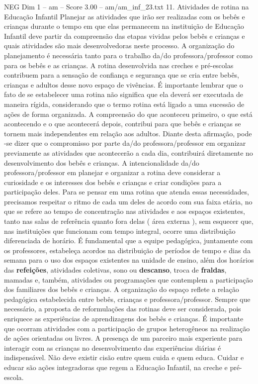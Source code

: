 \begin{textsample}{NEG Dim 1 – am – Score 3.00 – am/am\_inf\_23.txt}  \label{ex:f1_neg_067}
11.
Atividades de rotina na Educação Infantil Planejar as atividades que irão ser realizadas com os bebês e crianças durante o tempo em que elas permanecem na instituição de Educação Infantil deve partir da compreensão das etapas vividas pelos bebês e crianças e quais atividades são mais desenvolvedoras neste processo.
A organização do planejamento é necessária tanto para o trabalho da/do professora/professor como para os bebês e as crianças.
A rotina desenvolvida nas creches e pré-escolas contribuem para a sensação de confiança e segurança que se cria entre bebês, crianças e adultos desse novo espaço de vivências.
É importante lembrar que o fato de se estabelecer uma rotina não significa que ela deverá ser executada de maneira rígida, considerando que o termo rotina está ligado a uma sucessão de ações de forma organizada.
A compreensão do que aconteceu primeiro, o que está acontecendo e o que acontecerá depois, contribui para que bebês e crianças se tornem mais independentes em relação aos adultos.
Diante desta afirmação, pode -se dizer que o compromisso por parte da/do professora/professor em organizar previamente as atividades que acontecerão a cada dia, contribuirá diretamente no desenvolvimento dos bebês e crianças.
A intencionalidade da/do professora/professor em planejar e organizar a rotina deve considerar a curiosidade e os interesses dos bebês e crianças e criar condições para a participação deles.
Para se pensar em uma rotina que atenda essas necessidades, precisamos respeitar o ritmo de cada um deles de acordo com sua faixa etária, no que se refere ao tempo de concentração nas atividades e aos espaços existentes, tanto nas salas de referência quanto fora delas ( área externa ), sem esquecer que, nas instituições que funcionam com tempo integral, ocorre uma distribuição diferenciada de horário.
É fundamental que a equipe pedagógica, juntamente com os professores, estabeleça acordos na distribuição de períodos de tempo e dias da semana para o uso dos espaços existentes na unidade de ensino, além dos horários das \textbf{refeições}, atividades coletivas, sono ou \textbf{descanso}, troca de \textbf{fraldas}, mamadas e, também, atividades ou programações que contemplem a participação dos familiares dos bebês e crianças.
A organização do espaço reflete a relação pedagógica estabelecida entre bebês, crianças e professora/professor.
Sempre que necessário, a proposta de reformulações das rotinas deve ser considerada, pois enriquece as experiências de aprendizagens dos bebês e crianças.
É importante que ocorram atividades com a participação de grupos heterogêneos na realização de ações orientadas ou livres.
A presença de um parceiro mais experiente para interagir com as crianças no desenvolvimento das experiências diárias é indispensável.
Não deve existir cisão entre quem cuida e quem educa.
Cuidar e educar são ações integradoras que regem a Educação Infantil, na creche e pré-escola.

\end{textsample}
